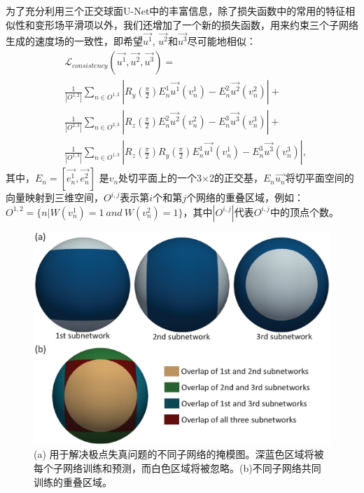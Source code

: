 为了充分利用三个正交球面U-Net中的丰富信息，除了损失函数中的常用的特征相似性和变形场平滑项以外，我们还增加了一个新的损失函数，用来约束三个子网络生成的速度场的一致性，即希望$\overrightarrow{u^1}$, $\overrightarrow{u^2}$和$\overrightarrow{u^3}$尽可能地相似：
\begin{equation}
\begin{split}
&{\mathcal{L}}_{consistency}({\overrightarrow{u^1}},{\overrightarrow{u^2}},{\overrightarrow{u^3}}) = \\
& \frac{1}{{\left| {{O^{1,2}}} \right|}}\sum\nolimits_{n \in {O^{1,2}}} {\left| {{R_y}(\frac{\pi }{2})E_n^1{\overrightarrow{u^1}}(v_n^1) - E_n^2{\overrightarrow{u^2}}(v_n^2)} \right| + } \\
&\frac{1}{{\left| {{O^{2,3}}} \right|}}\sum\nolimits_{n \in {O^{2,3}}} {\left| {{R_z}(\frac{\pi }{2})E_n^2{\overrightarrow{u^2}}(v_n^2) - E_n^3{\overrightarrow{u^3}}(v_n^3)} \right| + } \\
&\frac{1}{{\left| {{O^{1,3}}} \right|}}\sum\nolimits_{n \in {O^{1,3}}} {\left| {{R_z}(\frac{\pi }{2}){R_y}(\frac{\pi }{2})E_n^1{\overrightarrow{u^1}}(v_n^1) - E_n^3{\overrightarrow{u^3}}(v_n^3)} \right|},
\end{split}
\end{equation}
其中，$E_n=[\overrightarrow{e_n^1}, \overrightarrow{e_n^2}]$ 是$v_n$处切平面上的一个3$\times$2的正交基，$E_n\overrightarrow{u_n}$将切平面空间的向量映射到三维空间，$O^{i,j}$表示第$i$个和第$j$个网络的重叠区域，例如：$O^{1,2}=\{n|W(v_n^1)=1 \: and \: W(v_n^2)=1\}$，其中$|O^{i,j}|$代表$O^{i,j}$中的顶点个数。

\begin{figure}[t]
	\centering
	\includegraphics[width=0.7\linewidth]{figure/index.eps}
	\caption{(a) 用于解决极点失真问题的不同子网络的掩模图。深蓝色区域将被每个子网络训练和预测，而白色区域将被忽略。(b)不同子网络共同训练的重叠区域。}
	\label{fig:S3Reg_index}
\end{figure}


